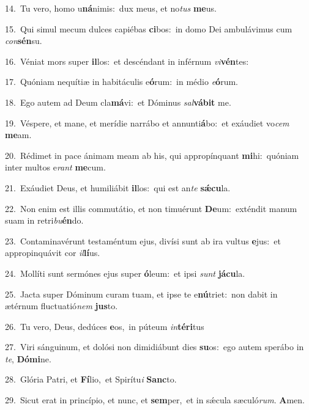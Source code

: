 {\numbfont\textcolor{\numbcolor}{14.}}~Tu vero, homo u\-\textbf{ná}\-nimis:~\star dux meus, et no\textit{tus} \textbf{me}\-us.\par
{\numbfont\textcolor{\numbcolor}{15.}}~Qui simul mecum dulces capiébas \textbf{ci}\-bos:~\star in domo Dei ambulávimus cum \textit{con}\-\textbf{sén}su.\par
{\numbfont\textcolor{\numbcolor}{16.}}~Véniat mors super \textbf{il}\-los:~\star et descéndant in inférnum \textit{vi}\-\textbf{vén}tes:\par
{\numbfont\textcolor{\numbcolor}{17.}}~Quóniam nequítiæ in habitáculis e\-\textbf{ó}\-rum:~\star in médio \textit{e}\-\textbf{ó}rum.\par
{\numbfont\textcolor{\numbcolor}{18.}}~Ego autem ad Deum cla\-\textbf{má}\-vi:~\star et Dóminus \textit{sal}\-\textbf{vá}\textbf{bit} me.\par
{\numbfont\textcolor{\numbcolor}{19.}}~Véspere, et mane, et merídie narrábo et annunti\-\textbf{á}\-bo:~\star et exáudiet vo\textit{cem} \textbf{me}\-am.\par
{\numbfont\textcolor{\numbcolor}{20.}}~Rédimet in pace ánimam meam ab his, qui appropínquant \textbf{mi}\-hi:~\star quóniam inter multos e\textit{rant} \textbf{me}\-cum.\par
{\numbfont\textcolor{\numbcolor}{21.}}~Exáudiet Deus, et humiliábit \textbf{il}\-los:~\star qui est an\textit{te} \textbf{sǽ}\-\textbf{cu}la.\par
{\numbfont\textcolor{\numbcolor}{22.}}~Non enim est illis commutátio, et non timuérunt \textbf{De}\-um:~\star exténdit manum suam in retri\-\textit{bu}\-\textbf{én}do.\par
{\numbfont\textcolor{\numbcolor}{23.}}~Contaminavérunt testaméntum ejus, divísi sunt ab ira vultus \textbf{e}\-jus:~\star et appropinquávit cor \textit{il}\-\textbf{lí}us.\par
{\numbfont\textcolor{\numbcolor}{24.}}~Mollíti sunt sermónes ejus super \textbf{ó}\-leum:~\star et ipsi \textit{sunt} \textbf{já}\-\textbf{cu}la.\par
{\numbfont\textcolor{\numbcolor}{25.}}~Jacta super Dóminum curam tuam, et ipse te e\-\textbf{nú}\-triet:~\star non dabit in ætérnum fluctuatió\textit{nem} \textbf{jus}\-to.\par
{\numbfont\textcolor{\numbcolor}{26.}}~Tu vero, Deus, dedúces \textbf{e}\-os,~\star in púteum \textit{in}\-\textbf{tér}\textbf{i}tus\par
{\numbfont\textcolor{\numbcolor}{27.}}~Viri sánguinum, et dolósi non dimidiábunt dies \textbf{su}\-os:~\star ego autem sperábo in \textit{te}\-, \textbf{Dó}\-\textbf{mi}ne.\par
{\numbfont\textcolor{\numbcolor}{28.}}~Glória Patri, et \textbf{Fí}\-lio,~\star et Spirítu\textit{i} \textbf{Sanc}\-to.\par
{\numbfont\textcolor{\numbcolor}{29.}}~Sicut erat in princípio, et nunc, et \textbf{sem}\-per,~\star et in sǽcula sæculó\-\textit{rum}\-. \textbf{A}\-men.\par
